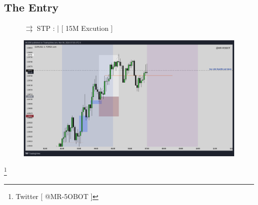 \documentclass{article}
\begin{document}
\subsection{The Entry}
\begin{figure}[h]
\begin{notebox}
  \( \rightrightarrows \) \hspace{0.1cm}STP : | [ 15M Excution ]
   \begin{center}
    \includegraphics[scale=0.35]{./figures/EURUSD_2024-03-06_5M_Entry.png}
  \end{center}
\end{notebox}
\end{figure}

\footnote{Twitter [ @MR-5OBOT ]}
\end{document}
